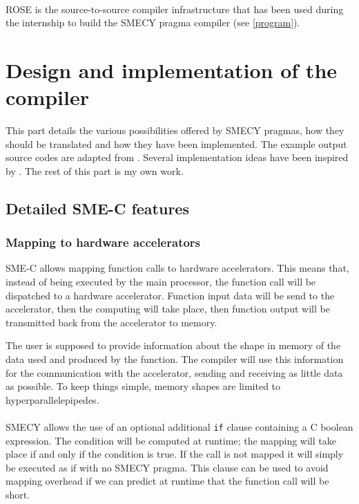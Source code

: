 \documentclass[a4paper]{article}
\begin{document}
	\paragraph{}ROSE is the source-to-source compiler infrastructure that has been used during the internship to build the SMECY pragma compiler (see \ref{program}).

\section{Design and implementation of the compiler}
	This part details the various possibilities offered by SMECY pragmas, how they should be translated and how they have been implemented. The example output source codes are adapted from \cite{smec}. Several implementation ideas have been inspired by \cite{roseomp}. The rest of this part is my own work.

	\subsection{Detailed SME-C features}
	
	\subsubsection{Mapping to hardware accelerators}
	SME-C allows mapping function calls to hardware accelerators. This means that, instead of being executed by the main processor, the function call will be dispatched to a hardware accelerator. Function input data will be send to the accelerator, then the computing will take place, then function output will be transmitted back from the accelerator to memory.
	
	The user is supposed to provide information about the shape in memory of the data used and produced by the function. The compiler will use this information for the communication with the accelerator, sending and receiving as little data as possible. To keep things simple, memory shapes are limited to hyperparallelepipedes.
	
	\paragraph{}SMECY allows the use of an optional additional \verb+if+ clause containing a C boolean expression. The condition will be computed at runtime; the mapping will take place if and only if the condition is true. If the call is not mapped it will simply be executed as if with no SMECY pragma. This clause can be used to avoid mapping overhead if we can predict at runtime that the function call will be short.
	
\end{document}
